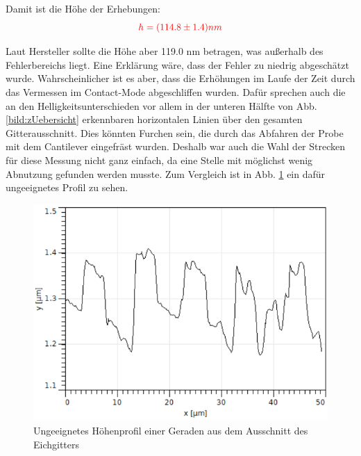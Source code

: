 Damit ist die Höhe der Erhebungen: 
\begin{equation*}
    \textcolor{red}{h = (114.8 \pm 1.4)nm}
\end{equation*}

Laut Hersteller sollte die Höhe aber 119.0 nm betragen, was außerhalb des Fehlerbereichs liegt. Eine Erklärung wäre, dass der Fehler 
zu niedrig abgeschätzt wurde. Wahrscheinlicher ist es aber, dass die Erhöhungen im Laufe der Zeit durch das Vermessen im Contact-Mode 
abgeschliffen wurden. Dafür sprechen auch die an den Helligkeitsunterschieden vor allem in der unteren Hälfte von 
Abb. \ref{bild:zUebersicht} erkennbaren horizontalen Linien über den gesamten Gitterausschnitt. Dies könnten Furchen sein, die durch das 
Abfahren der Probe mit dem Cantilever eingefräst wurden. Deshalb war auch die Wahl der Strecken für diese Messung nicht ganz einfach, da 
eine Stelle mit möglichst wenig Abnutzung gefunden werden musste. Zum Vergleich ist in Abb. \ref{bild:zUngeeignet} ein dafür 
ungeeignetes Profil zu sehen.

\begin{figure}[h]
    \centering
    \includegraphics[scale = 0.5]{Bilder/zUngeeignet.png}
    \caption{Ungeeignetes Höhenprofil einer Geraden aus dem Ausschnitt des Eichgitters}
    \label{bild:zUngeeignet}
\end{figure}
